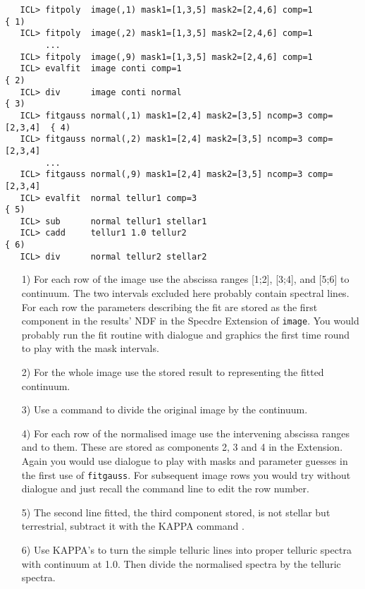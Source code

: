 \begin{verbatim}
   ICL> fitpoly  image(,1) mask1=[1,3,5] mask2=[2,4,6] comp=1             { 1)
   ICL> fitpoly  image(,2) mask1=[1,3,5] mask2=[2,4,6] comp=1
        ...
   ICL> fitpoly  image(,9) mask1=[1,3,5] mask2=[2,4,6] comp=1
   ICL> evalfit  image conti comp=1                                       { 2)
   ICL> div      image conti normal                                       { 3)
   ICL> fitgauss normal(,1) mask1=[2,4] mask2=[3,5] ncomp=3 comp=[2,3,4]  { 4)
   ICL> fitgauss normal(,2) mask1=[2,4] mask2=[3,5] ncomp=3 comp=[2,3,4]
        ...
   ICL> fitgauss normal(,9) mask1=[2,4] mask2=[3,5] ncomp=3 comp=[2,3,4]
   ICL> evalfit  normal tellur1 comp=3                                    { 5)
   ICL> sub      normal tellur1 stellar1
   ICL> cadd     tellur1 1.0 tellur2                                      { 6)
   ICL> div      normal tellur2 stellar2
\end{verbatim}

\begin{itemize}
\item[1)] For each row of the image use the abscissa ranges
   [1;2], [3;4], and [5;6] to
   continuum. The two intervals excluded here probably contain spectral
   lines. For each row the parameters describing the fit are stored as
   the first component in the results' NDF in the Specdre Extension of
   {\tt image}. You would probably run the fit routine with dialogue and
   graphics the first time round to play with the mask intervals.

\item[2)] For the whole image use the stored result to
   representing the fitted continuum.

\item[3)] Use a
   command to divide the original image by the continuum.

\item[4)] For each row of the normalised image use the intervening
   abscissa ranges and
   to them. These are stored as components 2, 3 and 4 in the Extension.
   Again you would use dialogue to play with masks and parameter guesses
   in the first use of {\tt fitgauss}.  For subsequent image rows you
   would try without dialogue and just recall the command line to edit
   the row number.

\item[5)] The second line fitted, the third component stored, is not
   stellar but terrestrial, subtract it with the KAPPA command
{\tt{}}.

\item[6)] Use KAPPA's
{\tt{}}
   to turn the simple telluric lines into proper telluric spectra with
   continuum at 1.0. Then divide the normalised spectra by the telluric
   spectra.
\end{itemize}

